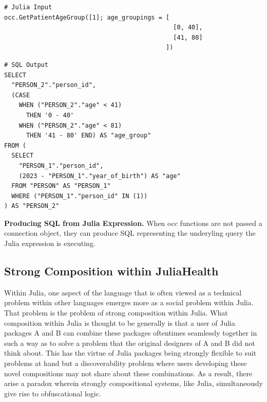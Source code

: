\documentclass{juliacon}
\begin{document}
\begin{listing}[!ht]
\begin{verbatim}
# Julia Input
occ.GetPatientAgeGroup([1]; age_groupings = [
                                              [0, 40], 
                                              [41, 80]
                                            ])

\end{verbatim}

\begin{verbatim}
# SQL Output
SELECT
  "PERSON_2"."person_id",
  (CASE 
    WHEN ("PERSON_2"."age" < 41) 
      THEN '0 - 40' 
    WHEN ("PERSON_2"."age" < 81) 
      THEN '41 - 80' END) AS "age_group"
FROM (
  SELECT
    "PERSON_1"."person_id",
    (2023 - "PERSON_1"."year_of_birth") AS "age"
  FROM "PERSON" AS "PERSON_1"
  WHERE ("PERSON_1"."person_id" IN (1))
) AS "PERSON_2"
\end{verbatim}
\caption{\textbf{Producing SQL from Julia Expression.} When occ functions are not passed a connection object, they can produce SQL representing the underyling query the Julia expression is executing.}
\label{listing:julia_sql}
\end{listing}

\subsection{Strong Composition within JuliaHealth}

Within Julia, one aspect of the language that is often viewed as a technical problem within other languages emerges more as a social problem within Julia.
That problem is the problem of strong composition within Julia.
What composition within Julia is thought to be generally is that a user of Julia packages A and B can combine these packages oftentimes seamlessly together in such a way as to solve a problem that the original designers of A and B did not think about.
This has the virtue of Julia packages being strongly flexible to suit problems at hand but a discoverability problem where users developing these novel compositions may not share about these combinations.
As a result, there arise a paradox wherein strongly compositional systems, like Julia, simultaneously give rise to obfuscational logic.
\end{document}
